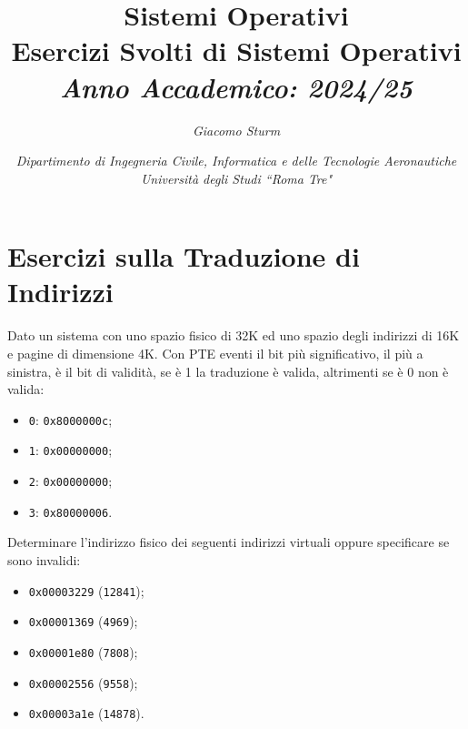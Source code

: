 \documentclass{article}
\numberwithin{equation}{subsection}
\begin{document}
\title{%
    \textbf{Sistemi Operativi}  \\ 
    \large Esercizi Svolti di Sistemi Operativi \\
    \textit{Anno Accademico: 2024/25}}
\author{\textit{Giacomo Sturm}}
\date{\textit{Dipartimento di Ingegneria Civile, Informatica e delle Tecnologie Aeronautiche \\
Università degli Studi ``Roma Tre"}}

\maketitle
\thispagestyle{link}

\clearpage


\pagestyle{fancy}
\fancyhead{}\fancyfoot{}
\fancyfoot[C]{\thepage}

\tableofcontents

\clearpage
{}




\section{Esercizi sulla Traduzione di Indirizzi}

Dato un sistema con uno spazio fisico di 32K ed uno spazio degli indirizzi di 16K e pagine di dimensione 4K. Con PTE eventi il bit più significativo, il più a sinistra, 
è il bit di validità, se è 1 la traduzione è valida, altrimenti se è 0 non è valida:
\begin{itemize}
    \item \verb|0|: \verb|0x8000000c|;
    \item \verb|1|: \verb|0x00000000|;
    \item \verb|2|: \verb|0x00000000|;
    \item \verb|3|: \verb|0x80000006|.
\end{itemize}

Determinare l'indirizzo fisico dei seguenti indirizzi virtuali oppure specificare se sono invalidi:
\begin{itemize}
    \item \verb|0x00003229| (\verb|12841|);
    \item \verb|0x00001369| (\verb|4969|);
    \item \verb|0x00001e80| (\verb|7808|);
    \item \verb|0x00002556| (\verb|9558|);
    \item \verb|0x00003a1e| (\verb|14878|).
\end{itemize}
\end{document}
